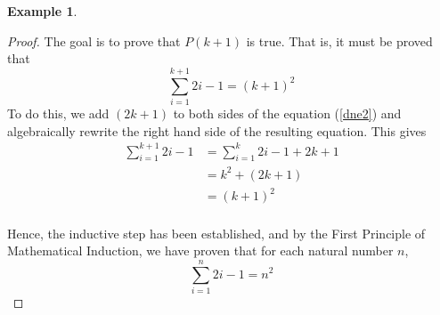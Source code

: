 \documentclass{book}
\theoremstyle{definition}
\newtheorem{example}{Example}[definition]
\theoremstyle{remark}
\begin{document}
\begin{example}
\begin{proof}
        The goal is to prove that $P(k+1)$ is true. That is, it must be proved that  
            \begin{equation}
            \label{dne2}
                \sum_{i=1}^{k+1}{2i-1} = (k+1)^2                
            \end{equation}
        To do this, we add $(2k+1)$ to both sides of the equation (\ref{dne2}) and algebraically rewrite the right hand side of the resulting equation. This gives
            \begin{align*}
                \sum_{i=1}^{k+1}{2i-1} & = \sum_{i=1}^{k}{2i-1} + 2k + 1 \\
                    & = k^2 + (2k + 1) \\
                    & = (k+1)^2 \\
            \end{align*}
        
        Hence, the inductive step has been established, and by the First Principle of Mathematical Induction, we have proven that for each natural number $n$,
            \begin{equation*}
                \sum_{i=1}^{n}{2i-1} = n^2
            \end{equation*}
    \end{proof}
\end{example}
\end{document}
